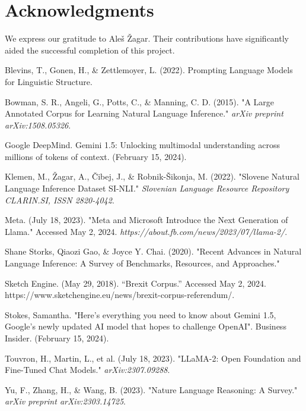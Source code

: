 \documentclass[fleqn,moreauthors,10pt]{ds_report}
\begin{document}

\section*{Acknowledgments}

We express our gratitude to Aleš Žagar. Their contributions have significantly aided the successful completion of this project.




Blevins, T., Gonen, H., \& Zettlemoyer, L. (2022). Prompting Language Models for Linguistic Structure.

Bowman, S. R., Angeli, G., Potts, C., \& Manning, C. D. (2015). "A Large Annotated Corpus for Learning Natural Language Inference." \textit{arXiv preprint arXiv:1508.05326}.

Google DeepMind. Gemini 1.5: Unlocking multimodal understanding across millions of tokens of context. (February 15, 2024).

Klemen, M., Žagar, A., Čibej, J., \& Robnik-Šikonja, M. (2022). "Slovene Natural Language Inference Dataset SI-NLI." \textit{Slovenian Language Resource Repository CLARIN.SI, ISSN 2820-4042}.

Meta. (July 18, 2023). "Meta and Microsoft Introduce the Next Generation of Llama." Accessed May 2, 2024. \allowbreak \textit{https://about.fb.com/news/2023/07/llama-2/}.

Shane Storks, Qiaozi Gao, \& Joyce Y. Chai. (2020). "Recent Advances in Natural Language Inference: A Survey of Benchmarks, Resources, and Approaches."

Sketch Engine. (May 29, 2018). “Brexit Corpus.” Accessed May 2, 2024. https://www.sketchengine.eu/news/brexit-corpus-referendum/.

Stokes, Samantha. "Here's everything you need to know about Gemini 1.5, Google's newly updated AI model that hopes to challenge OpenAI". Business Insider.  (February 15, 2024).

Touvron, H., Martin, L., et al. (July 18, 2023). "LLaMA-2: Open Foundation and Fine-Tuned Chat Models." \textit{arXiv:2307.09288}.

Yu, F., Zhang, H., \& Wang, B. (2023). "Nature Language Reasoning: A Survey." \textit{arXiv preprint arXiv:2303.14725}.
\end{document}
